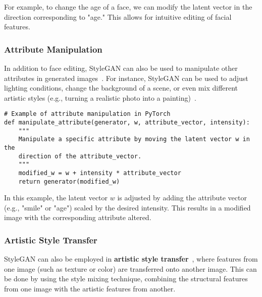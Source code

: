 For example, to change the age of a face, we can modify the latent vector in the direction corresponding to "age." This allows for intuitive editing of facial features.

\subsubsection{Attribute Manipulation}
In addition to face editing, StyleGAN can also be used to manipulate other attributes in generated images~\cite{patashnik2021styleclip}. For instance, StyleGAN can be used to adjust lighting conditions, change the background of a scene, or even mix different artistic styles (e.g., turning a realistic photo into a painting)~\cite{liu2023gan}.

\begin{lstlisting}[style=python]
# Example of attribute manipulation in PyTorch
def manipulate_attribute(generator, w, attribute_vector, intensity):
    """
    Manipulate a specific attribute by moving the latent vector w in the
    direction of the attribute_vector.
    """
    modified_w = w + intensity * attribute_vector
    return generator(modified_w)
\end{lstlisting}

In this example, the latent vector \( w \) is adjusted by adding the attribute vector (e.g., "smile" or "age") scaled by the desired intensity. This results in a modified image with the corresponding attribute altered.

\subsubsection{Artistic Style Transfer}
StyleGAN can also be employed in \textbf{artistic style transfer}~\cite{kotovenko2019content}, where features from one image (such as texture or color) are transferred onto another image. This can be done by using the style mixing technique, combining the structural features from one image with the artistic features from another.

\begin{center}
\end{center}

